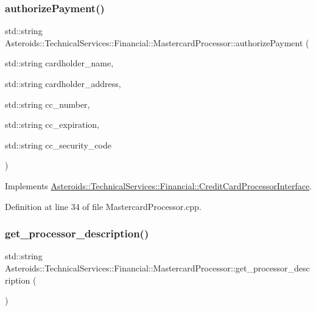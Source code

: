\subsubsection{\texorpdfstring{authorize\+Payment()}{authorizePayment()}}
{\footnotesize\ttfamily std\+::string Asteroids\+::\+Technical\+Services\+::\+Financial\+::\+Mastercard\+Processor\+::authorize\+Payment (\begin{DoxyParamCaption}\item[{std\+::string}]{cardholder\+\_\+name,  }\item[{std\+::string}]{cardholder\+\_\+address,  }\item[{std\+::string}]{cc\+\_\+number,  }\item[{std\+::string}]{cc\+\_\+expiration,  }\item[{std\+::string}]{cc\+\_\+security\+\_\+code }\end{DoxyParamCaption})\hspace{0.3cm}{\ttfamily [virtual]}}



Implements \hyperlink{classAsteroids_1_1TechnicalServices_1_1Financial_1_1CreditCardProcessorInterface_a605de1c4a264b4f9ae94ed13dd5fe1c0}{Asteroids\+::\+Technical\+Services\+::\+Financial\+::\+Credit\+Card\+Processor\+Interface}.



Definition at line 34 of file Mastercard\+Processor.\+cpp.

\mbox{\label{classAsteroids_1_1TechnicalServices_1_1Financial_1_1MastercardProcessor_a3dc222f21a228d61b581af1dbbd6e93b}} 
\subsubsection{\texorpdfstring{get\+\_\+processor\+\_\+description()}{get\_processor\_description()}}
{\footnotesize\ttfamily std\+::string Asteroids\+::\+Technical\+Services\+::\+Financial\+::\+Mastercard\+Processor\+::get\+\_\+processor\+\_\+description (\begin{DoxyParamCaption}{ }\end{DoxyParamCaption})\hspace{0.3cm}{\ttfamily [virtual]}}



